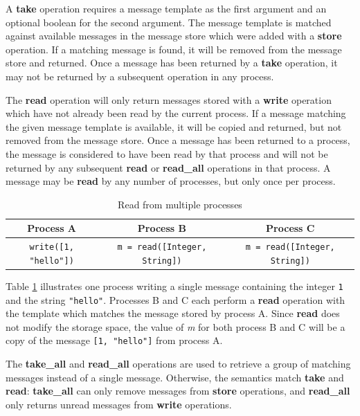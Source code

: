 \documentclass{llncs}
\begin{document}
A \textbf{take} operation requires a message template as the first argument and an optional boolean for the second argument. The message template is matched against available messages in the message store which were added with a \textbf{store} operation. If a matching message is found, it will be removed from the message store and returned. Once a message has been returned by a \textbf{take} operation, it may not be returned by a subsequent operation in any process.

The \textbf{read} operation will only return messages stored with a \textbf{write} operation which have not already been read by the current process. If a message matching the given message template is available, it will be copied and returned, but not removed from the message store. Once a message has been returned to a process, the message is considered to have been read by that process and will not be returned by any subsequent \textbf{read} or \textbf{read\_all} operations in that process. A message may be \textbf{read} by any number of processes, but only once per process.

\begin{table}
\centering
\caption{Read from multiple processes}
\begin{tabular}{|c|c|c|} \hline
\textbf{Process A} & \textbf{Process B} & \textbf{Process C} \\ \hline
\texttt{write([1, "hello"])} & \texttt{m = read([Integer, String])} & \texttt{m = read([Integer, String])} \\ \hline
\end{tabular}
\label{fig:readprocesses}
\end{table}

Table \ref{fig:readprocesses} illustrates one process writing a single message containing the integer \texttt{1} and the string \texttt{"hello"}. Processes B and C each perform a \textbf{read} operation with the template which matches the message stored by process A. Since \textbf{read} does not modify the storage space, the value of \textit{m} for both process B and C will be a copy of the message \texttt{[1, "hello"]} from process A.

The \textbf{take\_all} and \textbf{read\_all} operations are used to retrieve a group of matching messages instead of a single message. Otherwise, the semantics match \textbf{take} and \textbf{read}: \textbf{take\_all} can only remove messages from \textbf{store} operations, and \textbf{read\_all} only returns unread messages from \textbf{write} operations.
\end{document}
